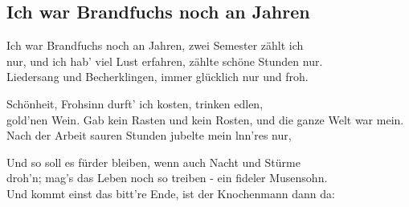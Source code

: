 
\subsection*{Ich war Brandfuchs noch an Jahren}
%

\thestrophe Ich war Brandfuchs noch an Jahren, zwei Semester zählt ich \\
nur, und ich hab' viel Lust erfahren, zählte schöne Stunden nur. \\
Liedersang und Becherklingen, immer glücklich nur und froh. \\

\thestrophe Schönheit, Frohsinn durft' ich kosten, trinken edlen, \\
gold'nen Wein. Gab kein Rasten und kein Rosten, und die ganze Welt war mein. \\
Nach der Arbeit sauren Stunden jubelte mein lnn'res nur, \\

\thestrophe Und so soll es fürder bleiben, wenn auch Nacht und Stürme \\
droh'n; mag's das Leben noch so treiben - ein fideler Musensohn. \\
Und kommt einst das bitt're Ende, ist der Knochenmann dann da: \\
